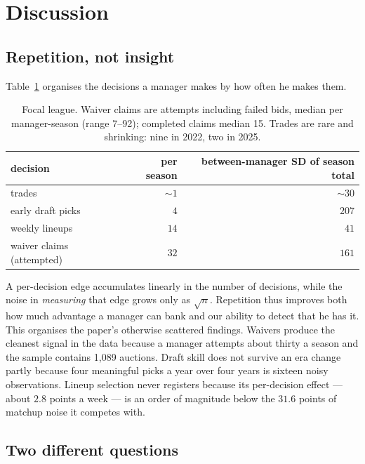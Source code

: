 \documentclass[11pt]{article}
\begin{document}
\section{Discussion}

\subsection{Repetition, not insight}

Table~\ref{tab:reps} organises the decisions a manager makes by how often he
makes them.

\begin{table}[h]
\centering\small
\begin{tabular}{lrr}
\toprule
decision & per season & between-manager SD of season total \\
\midrule
trades                 & $\sim1$  & $\sim30$ \\
early draft picks      & $4$      & $207$ \\
weekly lineups         & $14$     & $41$ \\
waiver claims (attempted) & $32$ & $161$ \\
\bottomrule
\end{tabular}
\caption{Focal league. Waiver claims are attempts including failed bids, median
per manager-season (range 7--92); completed claims median 15. Trades are rare and
shrinking: nine in 2022, two in 2025.}
\label{tab:reps}
\end{table}

A per-decision edge accumulates linearly in the number of decisions, while the
noise in \emph{measuring} that edge grows only as $\sqrt n$. Repetition thus
improves both how much advantage a manager can bank and our ability to detect
that he has it. This organises the paper's otherwise scattered findings. Waivers
produce the cleanest signal in the data because a manager attempts about thirty a
season and the sample contains 1{,}089 auctions. Draft skill does not survive an era change partly
because four meaningful picks a year over four years is sixteen noisy
observations. Lineup selection never registers because its per-decision effect
--- about $2.8$ points a week --- is an order of magnitude below the $31.6$
points of matchup noise it competes with.

\subsection{Two different questions}
\end{document}
